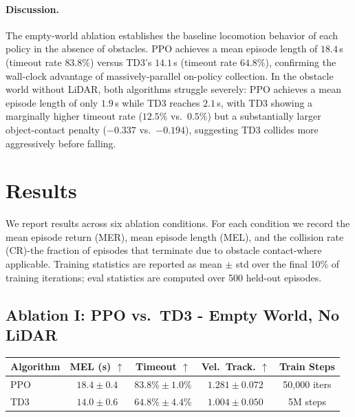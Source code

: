 \documentclass{article}
\begin{document}
  \paragraph{Discussion.}
  The empty-world ablation establishes the baseline locomotion behavior of each policy in the
  absence of obstacles.
  PPO achieves a mean episode length of $18.4$\,s (timeout rate $83.8\%$) versus TD3's $14.1$\,s
  (timeout rate $64.8\%$), confirming the wall-clock advantage of massively-parallel on-policy
  collection.
  In the obstacle world without LiDAR, both algorithms struggle severely: PPO achieves a mean
  episode length of only $1.9$\,s while TD3 reaches $2.1$\,s, with TD3 showing a marginally higher
  timeout rate ($12.5\%$ vs.\ $0.5\%$) but a substantially larger object-contact penalty
  ($-0.337$ vs.\ $-0.194$), suggesting TD3 collides more aggressively before falling.


\section{Results}

We report results across six ablation conditions.
For each condition we record the mean episode return (MER), mean episode
length (MEL), and the collision rate (CR)-the fraction of episodes that
terminate due to obstacle contact-where applicable.
Training statistics are reported as mean $\pm$ std over the final 10\% of
training iterations; eval statistics are computed over 500 held-out episodes.

\subsection{Ablation I: PPO vs.\ TD3 - Empty World, No LiDAR}

\begin{center}
\begin{tabular}{lcccc}
  \toprule
  \textbf{Algorithm} & \textbf{MEL (s)} $\uparrow$ & \textbf{Timeout} $\uparrow$
    & \textbf{Vel.\ Track.} $\uparrow$ & \textbf{Train Steps} \\
  \midrule
  PPO & $18.4 \pm 0.4$ & $83.8\% \pm 1.0\%$ & $1.281 \pm 0.072$ & 50{,}000 iters \\
  TD3 & $14.0 \pm 0.6$ & $64.8\% \pm 4.4\%$ & $1.004 \pm 0.050$ & 5M steps \\
  \bottomrule
\end{tabular}
\end{center}
\end{document}
